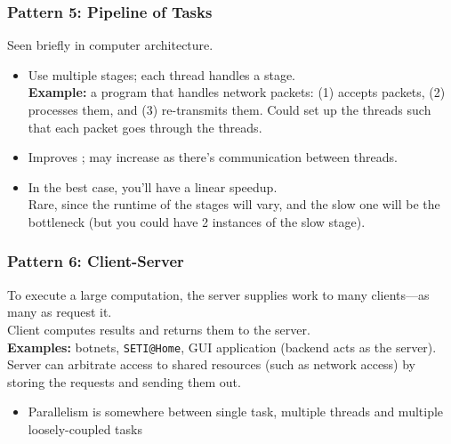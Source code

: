 \begin{frame}
  \frametitle{Pattern 5: Pipeline of Tasks}

  
    Seen briefly in computer architecture.

    \begin{itemize}
    \item Use multiple stages; each thread handles a stage.\\[1em]
     {\bf Example:} a program that handles network packets: (1) accepts
      packets, (2) processes them, and (3) re-transmits them. Could set up the threads such that each packet goes through the threads.
    \vfill
    \item Improves ; may increase  as
      there's communication between threads.
    \vfill
    \item In the best case, you'll have a linear speedup.\\[1em]

     Rare, since the runtime of the stages will vary, and the slow
      one will be the bottleneck (but you could have 2 instances of the
      slow stage).
  \end{itemize}
  
\end{frame}

\begin{frame}
  \frametitle{Pattern 6: Client-Server}

  
    To execute a large computation, the server supplies work to many
      clients---as many as request it.\\[1em]

    Client computes results and returns them to the server.\\[1em]
   {\bf Examples:} botnets, {\tt SETI@Home}, GUI application (backend
      acts as the server).\\[1em]
   Server can arbitrate access to shared resources (such as network
      access) by storing the requests and sending them out.\\[1em]

   \begin{itemize}
    \item Parallelism is somewhere between single task, multiple threads and
      multiple loosely-coupled tasks  
  \end{itemize}
  
\end{frame}

